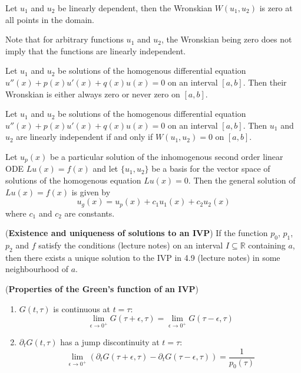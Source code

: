 \begin{theorem}
	Let $u_1$ and $u_2$ be linearly dependent, then the Wronskian $W(u_1, u_2)$ is zero at all points in the domain.
\end{theorem}

\begin{remark}
	Note that for arbitrary functions $u_1$ and $u_2$, the Wronskian being zero does not imply that the functions are linearly independent.
\end{remark}

\begin{lemma}
	Let $u_1$ and $u_2$ be solutions of the homogenous differential equation $u''(x) + p(x) u'(x) + q(x) u(x) = 0$ on an interval $[a, b]$. Then their Wronskian is either always zero or never zero on $[a, b]$.
\end{lemma}

\begin{lemma}
	Let $u_1$ and $u_2$ be solutions of the homogenous differential equation $u''(x) + p(x) u'(x) + q(x) u(x) = 0$ on an interval $[a, b]$. Then $u_1$ and $u_2$ are linearly independent if and only if $W(u_1, u_2) = 0$ on $[a, b]$.
\end{lemma}

\begin{theorem}
	Let $u_p(x)$ be a particular solution of the inhomogenous second order linear ODE $Lu(x) = f(x)$ and let $\{ u_1, u_2 \}$ be a basis for the vector space of solutions of the homogenous equation $Lu(x) = 0$. Then the general solution of $Lu(x) = f(x)$ is given by
	\[
		u_g(x) = u_p(x) + c_1 u_1(x) + c_2 u_2(x)
	\]
	where $c_1$ and $c_2$ are constants.
\end{theorem}

\begin{theorem}
	(\textbf{Existence and uniqueness of solutions to an IVP}) If the function $p_0$, $p_1$, $p_2$ and $f$ satisfy the conditions (lecture notes) on an interval $I \subseteq \mathbb{R}$ containing $a$, then there exists a unique solution to the IVP in 4.9 (lecture notes) in some neighbourhood of $a$.
\end{theorem}

\begin{proposition}
	(\textbf{Properties of the Green's function of an IVP})
	\begin{enumerate}
		\item $G(t, \tau)$ is continuous at $t = \tau$:
		\[
			\lim_{\epsilon \to 0^+} G(\tau + \epsilon, \tau) = \lim_{\epsilon \to 0^+} G(\tau - \epsilon, \tau)
		\]
		\item $\partial_t G(t, \tau)$ has a jump discontinuity at $t = \tau$:
		\[
			\lim_{\epsilon \to 0^+} (\partial_t G(\tau + \epsilon, \tau) - \partial_t G(\tau - \epsilon, \tau)) = \frac{1}{p_0(\tau)}
		\]
	\end{enumerate}
\end{proposition}

